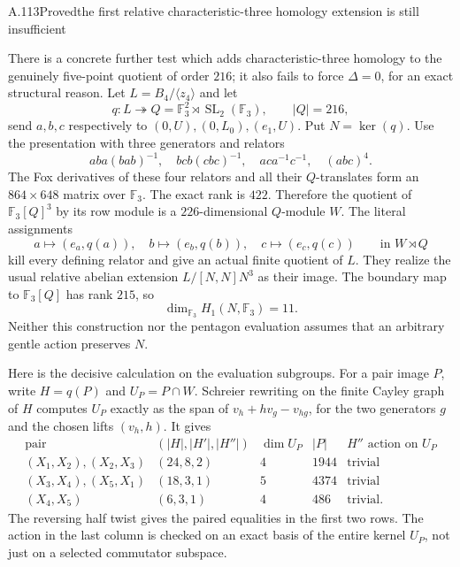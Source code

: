 \begin{statement}{A.113}{Proved}{the first relative characteristic-three homology extension is still insufficient}
\end{statement}
There is a concrete further test which adds characteristic-three
homology to the genuinely five-point quotient of order $216$;
it also fails to force $\Delta=0$, for an exact structural reason.
Let $L=B_4/\langle z_4\rangle$ and let
\[
 q:L\twoheadrightarrow Q=\mathbb F_3^2\rtimes
                 \operatorname{SL}_2(\mathbb F_3),\qquad |Q|=216,
\]
send $a,b,c$ respectively to $(0,U),(0,L_0),(e_1,U)$.
Put $N=\ker(q)$. Use the presentation with three generators
and relators
\[
 aba(bab)^{-1},\quad bcb(cbc)^{-1},\quad aca^{-1}c^{-1},
                  \quad(abc)^4.
\]
The Fox derivatives of these four relators and all their
$Q$-translates form an $864\times648$ matrix over $\mathbb F_3$.
The exact rank is $422$. Therefore the quotient of
$\mathbb F_3[Q]^3$ by its row module is a $226$-dimensional
$Q$-module $W$. The literal assignments
\[
       a\longmapsto(e_a,q(a)),\quad
       b\longmapsto(e_b,q(b)),\quad
       c\longmapsto(e_c,q(c))
           \qquad\text{in } W\rtimes Q
 \tag{FP.38.1}
\]
kill every defining relator and give an actual finite quotient
of $L$. They realize the usual relative abelian extension
$L/[N,N]N^3$ as their image. The boundary map to
$\mathbb F_3[Q]$ has rank $215$, so
\[
                    \dim_{\mathbb F_3}H_1(N,\mathbb F_3)=11.
\]
Neither this construction nor the pentagon evaluation assumes
that an arbitrary gentle action preserves $N$.

Here is the decisive calculation on the evaluation subgroups.
For a pair image $P$, write $H=q(P)$ and
$U_P=P\cap W$. Schreier rewriting on the finite Cayley graph
of $H$ computes $U_P$ exactly as the span of
$v_h+h v_g-v_{hg}$, for the two generators $g$ and the chosen
lifts $(v_h,h)$. It gives
\[
\begin{array}{c|c|c|c|c}
 \text{pair}&(|H|,|H'|,|H''|)&\dim U_P&|P|
       &H''\text{ action on }U_P\\ \hline
 (X_1,X_2),(X_2,X_3)&(24,8,2)&4&1944&\text{trivial}\\
 (X_3,X_4),(X_5,X_1)&(18,3,1)&5&4374&\text{trivial}\\
 (X_4,X_5)&(6,3,1)&4&486&\text{trivial}.
\end{array}
 \tag{FP.38.2}
\]
The reversing half twist gives the paired equalities in the
first two rows. The action in the last column is checked on
an exact basis of the entire kernel $U_P$, not just on a
selected commutator subspace.

